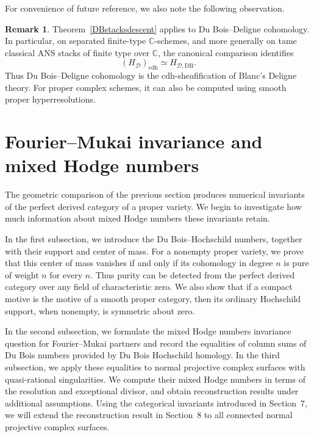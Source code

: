 \documentclass{amsart}
\theoremstyle{plain}
\theoremstyle{definition}
\newtheorem{remark}[prop]{Remark}
\newcommand{\bbC}{\mathbb{C}}
\newcommand{\DB}{\mathrm{DB}}
\newcommand{\cdh}{\mathrm{cdh}}
\begin{document}
\medskip

For convenience of future reference, we also note the following observation.

\begin{remark}
Theorem~\ref{DBstacksdescent} applies to Du Bois--Deligne cohomology. In particular, on separated finite-type $\bbC$-schemes, and more generally on tame classical ANS stacks of finite type over $\bbC$, the canonical comparison identifies
\[
(H_{\mathcal D})_{\cdh}\simeq H_{\mathcal D,\DB}.
\]
Thus Du Bois--Deligne cohomology is the cdh-sheafification of Blanc's Deligne theory.
For proper complex schemes, it can also be computed using smooth proper hyperresolutions.
\end{remark}


\medskip

\section{Fourier--Mukai invariance and mixed Hodge numbers}

The geometric comparison of the previous section produces numerical invariants of the perfect derived category of a proper variety. We begin to investigate how much information about mixed Hodge numbers these invariants retain.

In the first subsection, we introduce the Du Bois--Hochschild numbers, together with their support and center of mass. 
For a nonempty proper variety, we prove that this center of mass vanishes if and only if its cohomology in degree $n$ is pure of weight $n$ for every $n$.
Thus purity can be detected from the perfect derived category over any field of characteristic zero.
We also show that if a compact motive is the motive of a smooth proper category, then its ordinary Hochschild support, when nonempty, is symmetric about zero.


In the second subsection, we formulate the mixed Hodge numbers invariance question for Fourier--Mukai partners and record the equalities of column sums of Du Bois numbers provided by Du Bois Hochschild homology. In the third subsection, we apply these equalities to normal projective complex surfaces with quasi-rational singularities. We compute their mixed Hodge numbers in terms of the resolution and exceptional divisor, and obtain reconstruction results under additional assumptions. Using the categorical invariants introduced in Section~7, we will extend the reconstruction result in Section~8 to all connected normal projective complex surfaces.
\end{document}
